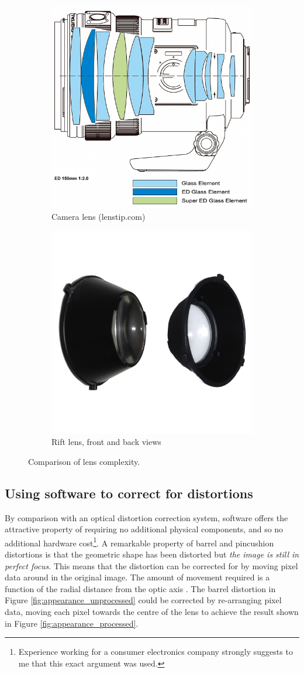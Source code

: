 \documentclass[MSc,paper=a4,pagesize=auto]{icldt}
\begin{document}
\begin{figure}[htbp!]
\centering
\begin{subfigure}{0.5\textwidth}
    \centering
    \includegraphics[width=0.5\linewidth]{resources/camera_lens}
    \caption{Camera lens (lenstip.com)}
	\label{fig:camera_lens}
\end{subfigure}%
\centering
\begin{subfigure}{0.5\textwidth}
    \centering
    \includegraphics[width=0.5\linewidth]{resources/rift_lenses}
    \caption{Rift lens, front and back views}
	\label{fig:rift_lens}
\end{subfigure}    
    \caption{Comparison of lens complexity.}
    \label{fig:lens_comparison}
\end{figure}

\subsection{Using software to correct for distortions}
By comparison with an optical distortion correction system, software offers the attractive property of requiring no additional physical components, and so no additional hardware cost\footnote{Experience working for a consumer electronics company strongly suggests to me that this exact argument was used.}. A remarkable property of barrel and pincushion distortions is that the geometric shape has been distorted but \textit{the image is still in perfect focus}. This means that the distortion can be corrected for by moving pixel data around in the original image. The amount of movement required is a function of the radial distance from the optic axis \cite{Brunelli2009}. The barrel distortion in Figure \ref{fig:appearance_unprocessed} could be corrected by re-arranging pixel data, moving each pixel towards the centre of the lens to achieve the result shown in Figure \ref{fig:appearance_processed}.
\end{document}
